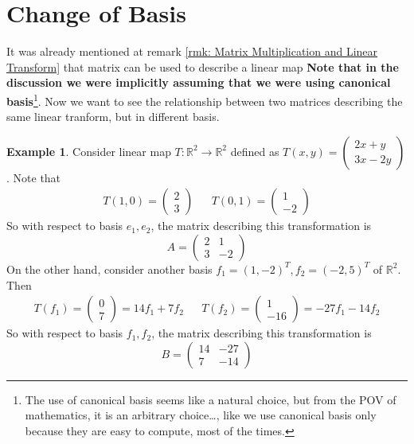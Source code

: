 \documentclass[12pt, a4paper]{article}
\newcommand{\R}{\mathbb{R}}
\theoremstyle{remark}
\theoremstyle{definition}
\newtheorem{example}{Example}
\numberwithin{equation}{section}
\numberwithin{definition}{section}
\numberwithin{example}{section}
\numberwithin{exercise}{section}
\numberwithin{remark}{section}
\numberwithin{figure}{section}
\begin{document}
\section{Change of Basis}
It was already mentioned at remark \ref{rmk: Matrix Multiplication and Linear Transform} that
matrix can be used to describe a linear map 
\textbf{Note that in the discussion we were implicitly assuming that we were using canonical basis}\footnote{
    The use of canonical basis seems like a natural choice, but from the POV of mathematics,
    it is an arbitrary choice\dots, like we use canonical basis only because they are easy to compute,
    most of the times.
}.
Now we want to see the relationship between two matrices describing the same linear tranform,
but in different basis.
\begin{example}
    \label{eg: Change of Basis}
    Consider linear map $T:\R^2 \rightarrow \R^2$ defined as $T(x,y) = 
    \begin{pmatrix}
        2x + y\\
        3x - 2y
    \end{pmatrix}
    $.
    Note that
    \begin{align*}
        T\left( 1,0 \right) = 
        \begin{pmatrix}
            2 \\ 3
        \end{pmatrix}
        &&
        T\left( 0,1 \right) = 
        \begin{pmatrix}
            1 \\ -2
        \end{pmatrix}
    \end{align*}
    So with respect to basis $e_1, e_2$, the matrix describing this transformation is
    \begin{equation*}
        A =
        \begin{pmatrix}
            2 & 1\\ 3 & -2
        \end{pmatrix}
    \end{equation*}
    On the other hand, consider another basis $f_1 = \left( 1, -2 \right)^T, f_2 = \left( -2, 5 \right)^T$ of $\R^2$.
    Then
    \begin{align*}
        T\left( f_1 \right) = 
        \begin{pmatrix}
            0 \\ 7
        \end{pmatrix}
        =
        14 f_1 + 7 f_2
        &&
        T\left( f_2 \right) = 
        \begin{pmatrix}
            1 \\ -16
        \end{pmatrix}
        = -27f_1 - 14f_2
    \end{align*}
    So with respect to basis $f_1, f_2$, the matrix describing this transformation is
    \begin{equation*}
        B =
        \begin{pmatrix}
            14 & -27 \\
            7 & -14
        \end{pmatrix}
    \end{equation*}


\end{example}
\end{document}
